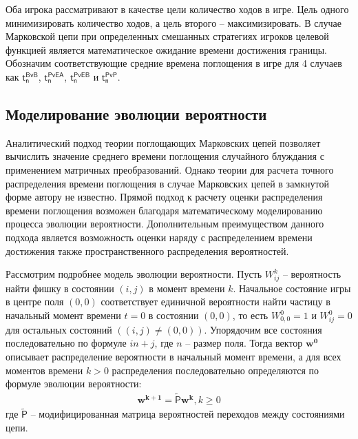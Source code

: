 Оба игрока рассматривают в качестве цели количество ходов в игре. Цель одного минимизировать количество ходов, а цель второго -- максимизировать.
В случае Марковской цепи при определенных смешанных стратегиях игроков целевой функцией является математическое ожидание времени достижения границы.
Обозначим соответствующие средние времена поглощения в игре для 4 случаев как $\boldsymbol{\mathsf{t_n^{BvB}}}$, 
$\boldsymbol{\mathsf{t_n^{PvEA}}}$, $\boldsymbol{\mathsf{t_n^{PvEB}}}$ и $\boldsymbol{\mathsf{t_n^{PvP}}}$.

\subsection{Моделирование эволюции вероятности}\label{subsec:ch3/sec2/sub2}

Аналитический подход теории поглощающих Марковских цепей позволяет вычислить значение среднего времени поглощения случайного блуждания с применением матричных преобразований. Однако теории для расчета точного распределения времени поглощения в случае Марковских цепей в замкнутой форме автору не известно. Прямой подход к расчету оценки распределения времени поглощения возможен благодаря математическому моделированию процесса эволюции вероятности. Дополнительным преимуществом данного подхода является возможность оценки наряду с распределением времени достижения также пространственного распределения вероятностей. 

Рассмотрим подробнее модель эволюции вероятности. Пусть $W_{ij}^{k}$ -- вероятность найти фишку в состоянии $(i, j)$ в момент времени $k$. Начальное состояние игры в центре поля $(0, 0)$ соответствует единичной вероятности найти частицу в начальный момент времени $t=0$ в состоянии $(0, 0)$, то есть $W_{0,0}^{0}=1$ и $W_{ij}^{0}=0$ для остальных состояний $((i, j) \neq (0, 0))$. Упорядочим все состояния последовательно по формуле $in + j$, где $n$ -- размер поля. Тогда вектор $\boldsymbol{w^{0}}$ описывает распределение вероятности в начальный момент времени, а для всех моментов времени $k > 0$ распределения последовательно определяются по формуле эволюции вероятности:
\begin{equation}
    \begin{aligned}
    \boldsymbol{w^{k+1}}=\mathsf{\widetilde{P}}\boldsymbol{w^{k}}, k \geq 0
    \label{eq:evolution}
    \end{aligned}
\end{equation}
где $\mathsf{\widetilde{P}}$ -- модифицированная матрица вероятностей переходов между состояниями цепи. 

